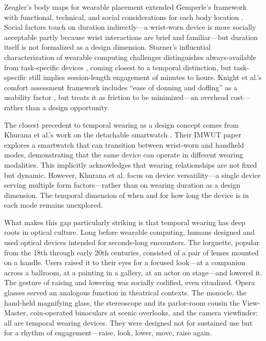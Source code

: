 Zeagler's body maps for wearable placement extended Gemperle's framework with functional, technical, and social considerations for each body location \cite{zeagler2017where}. Social factors touch on duration indirectly---a wrist-worn device is more socially acceptable partly because wrist interactions are brief and familiar---but duration itself is not formalized as a design dimension. Starner's influential characterization of wearable computing challenges distinguishes always-available from task-specific devices \cite{starner2001challenges}, coming closest to a temporal distinction, but task-specific still implies session-length engagement of minutes to hours. Knight et al.'s comfort assessment framework includes ``ease of donning and doffing'' as a usability factor \cite{knight2006comfort}, but treats it as friction to be minimized---an overhead cost---rather than a design opportunity.

The closest precedent to temporal wearing as a design concept comes from Khurana et al.'s work on the detachable smartwatch \cite{khurana2019detachable}. Their IMWUT paper explores a smartwatch that can transition between wrist-worn and handheld modes, demonstrating that the same device can operate in different wearing modalities. This implicitly acknowledges that wearing relationships are not fixed but dynamic. However, Khurana et al. focus on device versatility---a single device serving multiple form factors---rather than on wearing duration as a design dimension. The temporal dimension of when and for how long the device is in each mode remains unexplored.

What makes this gap particularly striking is that temporal wearing has deep roots in optical culture. Long before wearable computing, humans designed and used optical devices intended for seconds-long encounters. The lorgnette, popular from the 18th through early 20th centuries, consisted of a pair of lenses mounted on a handle. Users raised it to their eyes for a focused look---at a companion across a ballroom, at a painting in a gallery, at an actor on stage---and lowered it. The gesture of raising and lowering was socially codified, even ritualized. Opera glasses served an analogous function in theatrical contexts. The monocle, the hand-held magnifying glass, the stereoscope and its parlor-room cousin the View-Master, coin-operated binoculars at scenic overlooks, and the camera viewfinder: all are temporal wearing devices. They were designed not for sustained use but for a rhythm of engagement---raise, look, lower, move, raise again.


